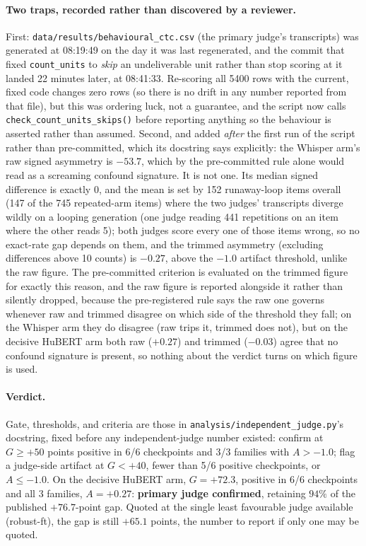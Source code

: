 \documentclass[11pt]{article}
\begin{document}
\paragraph{Two traps, recorded rather than discovered by a reviewer.} First:
\texttt{data/results/behavioural\_ctc.csv} (the primary judge's transcripts)
was generated at 08:19:49 on the day it was last regenerated, and the commit
that fixed \texttt{count\_units} to \emph{skip} an undeliverable unit rather
than stop scoring at it landed 22 minutes later, at 08:41:33. Re-scoring all
5400 rows with the current, fixed code changes zero rows (so there is no
drift in any number reported from that file), but this was ordering luck,
not a guarantee, and the script now calls \texttt{check\_count\_units\_skips()}
before reporting anything so the behaviour is asserted rather than assumed.
Second, and added \emph{after} the first run of the script rather than
pre-committed, which its docstring says explicitly: the Whisper arm's raw
signed asymmetry is $-53.7$, which by the pre-committed rule alone would read
as a screaming confound signature. It is not one. Its median signed
difference is exactly $0$, and the mean is set by 152 runaway-loop items
overall (147 of the 745 repeated-arm items) where the two judges' transcripts
diverge wildly on a looping generation (one judge reading 441 repetitions on
an item where the other reads 5); both
judges score every one of those items wrong, so no exact-rate gap depends on
them, and the trimmed asymmetry (excluding differences above 10 counts) is
$-0.27$, above the $-1.0$ artifact threshold, unlike the raw figure. The
pre-committed criterion is evaluated on the trimmed figure for exactly this
reason, and the raw figure is reported alongside it rather than silently
dropped, because the pre-registered rule says the raw one governs whenever
raw and trimmed disagree on which side of the threshold they fall; on the
Whisper arm they do disagree (raw trips it, trimmed does not), but on the
decisive HuBERT arm both raw ($+0.27$) and trimmed ($-0.03$) agree that no
confound signature is present, so nothing about the verdict turns on which
figure is used.

\paragraph{Verdict.} Gate, thresholds, and criteria are those in
\texttt{analysis/independent\_judge.py}'s docstring, fixed before any
independent-judge number existed: confirm at $G\ge+50$ points positive in
6/6 checkpoints and 3/3 families with $A>-1.0$; flag a judge-side artifact at
$G<+40$, fewer than 5/6 positive checkpoints, or $A\le-1.0$. On the decisive
HuBERT arm, $G=+72.3$, positive in 6/6 checkpoints and all 3 families,
$A=+0.27$: \textbf{primary judge confirmed}, retaining $94\%$ of the
published $+76.7$-point gap. Quoted at the single least favourable judge
available (robust-ft), the gap is still $+65.1$ points, the number to
report if only one may be quoted.
\end{document}
